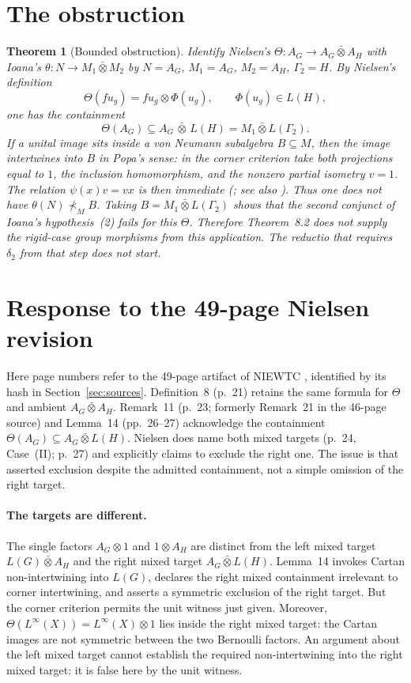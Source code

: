 \documentclass[11pt]{article}
\newtheorem{theorem}{Theorem}
\begin{document}
\section{The obstruction}

\begin{theorem}[Bounded obstruction]
\label{thm:main}
Identify Nielsen's $\Theta\colon A_G\to A_G\bar\otimes A_H$ with Ioana's
$\theta\colon N\to M_1\bar\otimes M_2$ by
$N=A_G$, $M_1=A_G$, $M_2=A_H$, $\Gamma_2=H$.
By Nielsen's definition
\[
\Theta(f u_g)=f u_g\otimes\Phi(u_g),\qquad \Phi(u_g)\in L(H),
\]
one has the containment
\[
\Theta(A_G)\subseteq A_G\,\bar\otimes\, L(H)=M_1\bar\otimes L(\Gamma_2).
\]
If a unital image sits inside a von Neumann subalgebra $B\subseteq M$, then the
image intertwines into $B$ in Popa's sense: in the corner criterion take
both projections equal to $1$, the inclusion homomorphism, and the nonzero
partial isometry $v=1$. The relation $\psi(x)v=vx$ is then immediate
(\cite[Theorem~1.3.1(1), p.~1184]{Ioana2011}; see also \cite{Popa2006}).
Thus one does not have $\theta(N)\nprec_M B$. Taking
$B=M_1\bar\otimes L(\Gamma_2)$ shows that the second conjunct of Ioana's
hypothesis~(2) fails for this $\Theta$. Therefore Theorem~8.2 does not supply
the rigid-case group morphisms from this application. The reductio that requires
$\delta_2$ from that step does not start.
\end{theorem}

\section{Response to the 49-page Nielsen revision}

Here page numbers refer to the 49-page artifact of NIEWTC
\cite{Nielsen2026}, identified by its hash in Section~\ref{sec:sources}.
Definition~8 (p.~21) retains the same formula for $\Theta$ and ambient
$A_G\bar\otimes A_H$. Remark~11 (p.~23; formerly Remark~21 in the
46-page source) and Lemma~14 (pp.~26--27) acknowledge the containment
$\Theta(A_G)\subseteq A_G\bar\otimes L(H)$.
Nielsen does name both mixed targets (p.~24, Case~(II); p.~27) and explicitly
claims to exclude the right one. The issue is that asserted exclusion despite the admitted
containment, not a simple omission of the right target.

\paragraph{The targets are different.}
The single factors $A_G\otimes1$ and $1\otimes A_H$ are distinct from
the left mixed target $L(G)\bar\otimes A_H$ and the right mixed target
$A_G\bar\otimes L(H)$. Lemma~14 invokes Cartan non-intertwining into
$L(G)$, declares the right mixed containment irrelevant to corner
intertwining, and asserts a symmetric exclusion of the right target.
But the corner criterion permits the unit witness just given.
Moreover, $\Theta(L^\infty(X))=L^\infty(X)\otimes1$ lies inside the
right mixed target: the Cartan images are not symmetric between the two
Bernoulli factors. An argument about the left mixed target cannot establish
the required non-intertwining into the right mixed target: it is false here
by the unit witness.
\end{document}

